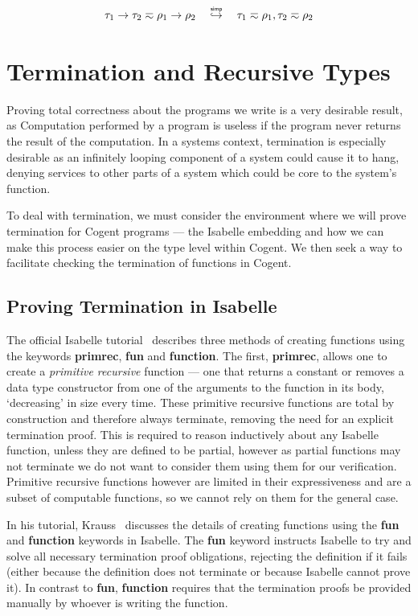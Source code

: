 \[
    \tau_1 \rightarrow \tau_2 \typeeq \rho_1 \rightarrow \rho_2 
    \hspace{1em} \simp \hspace{1em}
    \tau_1 \typeeq \rho_1, \tau_2 \typeeq \rho_2
\]



\section{Termination and Recursive Types}

Proving total correctness about the programs we write is a very desirable result, as
Computation performed by a program is useless if the program never returns the
result of the computation.
In a systems context, termination is especially desirable as an infinitely looping component of a
system could cause it to hang, denying services to other parts of a system which could be core to the
system's function.

To deal with termination, we must consider the environment where we will prove termination for
Cogent programs --- the Isabelle embedding and how we can make this process easier on the type
level within Cogent. We then seek a way to facilitate checking the termination of functions
in Cogent.

\subsection{Proving Termination in Isabelle}

The official Isabelle tutorial~\citep{IsabelleTutorial} describes three methods of creating functions using
the keywords \textbf{primrec}, \textbf{fun} and \textbf{function}. The first, \textbf{primrec},
allows one to create a \textit{primitive recursive} function --- one that returns a constant or removes
a data type constructor from one of the arguments to the function in its body, `decreasing' in size every time.
These primitive recursive functions are total by construction and therefore always terminate, removing the need for
an explicit termination proof. This is required to reason inductively about any Isabelle function,
unless they are defined to be partial, however as partial functions may not terminate we do not want
to consider them using them for our verification. Primitive recursive functions however are limited
in their expressiveness and are a subset of computable functions, so we cannot rely on them for the general case.

In his tutorial, Krauss~\citep{KraussIsabelle} discusses the details of creating functions using the \textbf{fun}
and \textbf{function} keywords in Isabelle. The \textbf{fun} keyword instructs Isabelle to try and solve all necessary
termination proof obligations, rejecting the definition if it fails (either because the definition does not 
terminate or because Isabelle cannot prove it). In contrast to \textbf{fun}, \textbf{function}
requires that the termination proofs be provided manually by whoever is writing the function.

